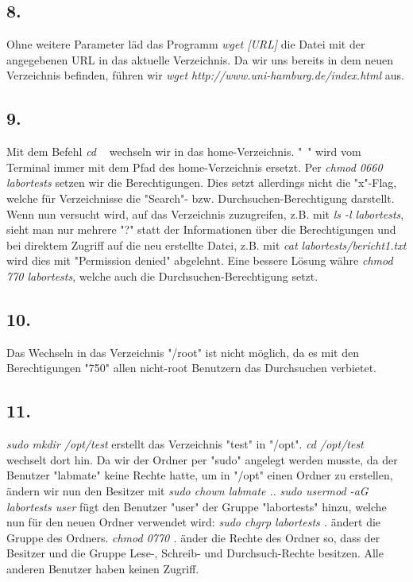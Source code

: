 \documentclass[
    fontsize=10pt,
    headings=medium,
    parskip=half,           %
    bibliography=totoc,
    numbers=noenddot,       %
    open=any,               %
    a4paper,
    ]{scrreprt}
\begin{document}
\subsection*{8.}
Ohne weitere Parameter läd das Programm \emph{wget [URL]} die Datei mit der angegebenen URL in das aktuelle Verzeichnis. Da wir uns bereits in dem neuen Verzeichnis befinden, führen wir \emph{wget http://www.uni-hamburg.de/index.html} aus.

\subsection*{9.}
Mit dem Befehl \emph{cd ~} wechseln wir in das home-Verzeichnis. "~" wird vom Terminal immer mit dem Pfad des home-Verzeichnis ersetzt. Per \emph{chmod 0660 labortests} setzen wir die Berechtigungen. Dies setzt allerdings nicht die "x"-Flag, welche für Verzeichnisse die "Search"- bzw. Durchsuchen-Berechtigung darstellt. Wenn nun versucht wird, auf das Verzeichnis zuzugreifen, z.B. mit \emph{ls -l labortests}, sieht man nur mehrere "?" statt der Informationen über die Berechtigungen und bei direktem Zugriff auf die neu erstellte Datei, z.B. mit \emph{cat labortests/bericht1.txt} wird dies mit "Permission denied" abgelehnt.
Eine bessere Lösung währe \emph{chmod 770 labortests}, welche auch die Durchsuchen-Berechtigung setzt.

\subsection*{10.}
Das Wechseln in das Verzeichnis "/root" ist nicht möglich, da es mit den Berechtigungen "750" allen nicht-root Benutzern das Durchsuchen verbietet.

\subsection*{11.}
\emph{sudo mkdir /opt/test} erstellt das Verzeichnis "test" in "/opt". \emph{cd /opt/test} wechselt dort hin.
Da wir der Ordner per "sudo" angelegt werden musste, da der Benutzer "labmate" keine Rechte hatte, um in "/opt" einen Ordner zu erstellen, ändern wir nun den Besitzer mit \emph{sudo chown labmate .}.
\emph{sudo usermod -aG labortests user} fügt den Benutzer "user" der Gruppe "labortests" hinzu, welche nun für den neuen Ordner verwendet wird: \emph{sudo chgrp labortests .} ändert die Gruppe des Ordners.
\emph{chmod 0770 .} änder die Rechte des Ordner so, dass der Besitzer und die Gruppe Lese-, Schreib- und Durchsuch-Rechte besitzen. Alle anderen Benutzer haben keinen Zugriff.
\end{document}
